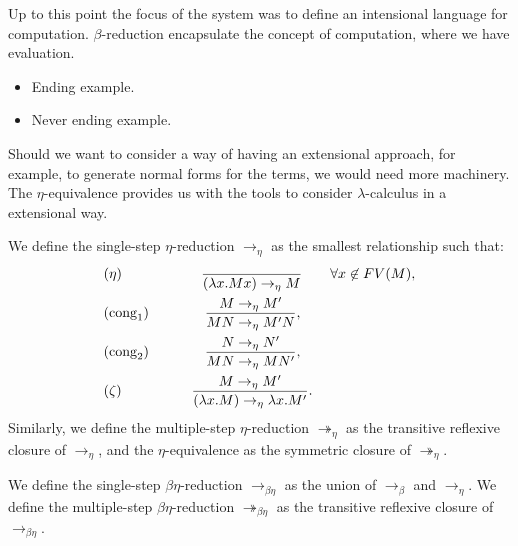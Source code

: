 Up to this point the focus of the system was to define an intensional language for computation. $\beta$-reduction encapsulate the concept of computation, where we have evaluation.

\begin{example}
  \begin{itemize}
  \item Ending example.
  \item Never ending example.
  \end{itemize}
\end{example}


Should we want to consider a way of having an extensional approach, for example, to generate normal forms for the terms, we would need more machinery. The $\eta$-equivalence provides us with the tools to consider $\lambda$-calculus in a extensional way. \\

\begin{definition}
We define the single-step $\eta$-reduction $\to_\eta$ as the smallest relationship such that: 
  \begin{align*}
    &(\eta) \qquad\qquad \ \ \ \  \ {\ \over(\lambda x.Mx) \to_\eta M} \qquad \forall x \not  \in FV(M),\\
    &(\operatorname{cong}_1)\qquad\qquad{ M \to_\eta M' \over MN \to_\eta M'N },\\
    &(\operatorname{cong}_2)\qquad\qquad{ N \to_\eta N' \over MN \to_\eta MN' },\\
    &(\zeta) \qquad\qquad \ \  \ {M\to_\eta M' \over(\lambda x.M) \to_\eta \lambda x.M'}.\\
  \end{align*}
  Similarly, we define the multiple-step $\eta$-reduction $\twoheadrightarrow_\eta$ as the transitive reflexive closure of $\to_\eta$, and the $\eta$-equivalence as the symmetric closure of $\twoheadrightarrow_\eta$.
\end{definition}
\begin{definition}
  We define the single-step $\beta\eta$-reduction $\to_{\beta\eta}$ as the union of $\to_\beta$ and $\to_\eta$.  We define the multiple-step $\beta\eta$-reduction $\twoheadrightarrow_{\beta\eta}$ as the transitive reflexive closure of $\to_{\beta\eta}$.
\end{definition}



